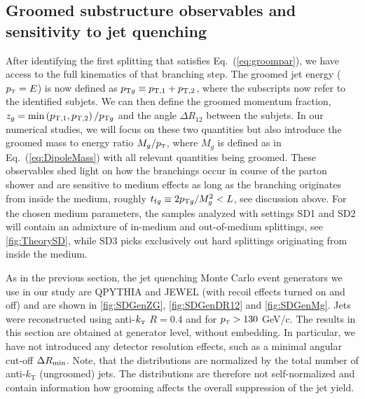 \subsection{Groomed substructure observables and sensitivity to jet quenching}
\label{sec:groomedobservables}

After identifying the first splitting that satisfies Eq.~(\ref{eq:groompar}), we have access to the full kinematics of that branching step. The groomed jet energy ($p_{\text{\tiny T}} = E$) is now defined as $p_{{\rm \tiny T} g} \equiv p_{\mathrm{T},1}+p_{\mathrm{T},2}$, where the subscripts now refer to the identified subjets. We can then define the groomed momentum fraction, $z_g = \min \left(p_{{\rm \tiny T},1},p_{{\rm \tiny T},2}\right)/p_{{\rm \tiny T}g}$ and the angle $\Delta R_{12}$ between the subjets. In our numerical studies, we will focus on these two quantities but also introduce the groomed mass to energy ratio $M_g/p_{\text{\tiny T}}$, where $M_g$ is defined as in Eq.~(\ref{eq:DipoleMass}) with all relevant quantities being groomed. These observables shed light on how the branchings occur in course of the parton shower and are sensitive to medium effects as long as the branching originates from inside the medium, roughly $ t_{{\rm f}g}\equiv 2 p_{{\rm \tiny T}g}/M_g^2 < L$, see discussion above. For the chosen medium parameters, the samples analyzed with settings SD1 and SD2 will contain an admixture of in-medium and out-of-medium splittings, see \autoref{fig:TheorySD}, while SD3 picks exclusively out hard splittings originating from inside the medium. 

As in the previous section, the jet quenching Monte Carlo event generators we use in our study are QPYTHIA and JEWEL (with recoil effects turned on and off) and are shown in \autoref{fig:SDGenZG}, \ref{fig:SDGenDR12} and \ref{fig:SDGenMg}. Jets were reconstructed using anti-$k_{\text{\tiny T}}$ $R=0.4$ and for $p_{\text{\tiny T}} > 130$ GeV/c. 
The results in this section are obtained at generator level, without embedding. In particular, we have not introduced any detector resolution effects, such as a minimal angular cut-off $\Delta R_{\rm min}$.
Note, that the distributions are normalized by the total number of anti-$k_{\text{T}}$ (ungroomed) jets. The distributions are therefore not self-normalized and contain information how grooming affects the overall suppression of the jet yield. 


